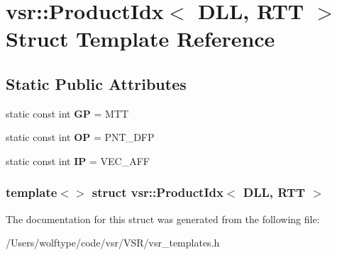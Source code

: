 \hypertarget{structvsr_1_1_product_idx_3_01_d_l_l_00_01_r_t_t_01_4}{\section{vsr\-:\-:Product\-Idx$<$ D\-L\-L, R\-T\-T $>$ Struct Template Reference}
\label{structvsr_1_1_product_idx_3_01_d_l_l_00_01_r_t_t_01_4}
}
\subsection*{Static Public Attributes}
\begin{DoxyCompactItemize}
\item 
\hypertarget{structvsr_1_1_product_idx_3_01_d_l_l_00_01_r_t_t_01_4_ac165e664111b996ece58e6d2708e7d6e}{static const int {\bfseries G\-P} = M\-T\-T}\label{structvsr_1_1_product_idx_3_01_d_l_l_00_01_r_t_t_01_4_ac165e664111b996ece58e6d2708e7d6e}

\item 
\hypertarget{structvsr_1_1_product_idx_3_01_d_l_l_00_01_r_t_t_01_4_a14f3c68b78e935e30bf356f6651045c0}{static const int {\bfseries O\-P} = P\-N\-T\-\_\-\-D\-F\-P}\label{structvsr_1_1_product_idx_3_01_d_l_l_00_01_r_t_t_01_4_a14f3c68b78e935e30bf356f6651045c0}

\item 
\hypertarget{structvsr_1_1_product_idx_3_01_d_l_l_00_01_r_t_t_01_4_aab9e9d7aa0c8ad3567a9e0e09d9bc85c}{static const int {\bfseries I\-P} = V\-E\-C\-\_\-\-A\-F\-F}\label{structvsr_1_1_product_idx_3_01_d_l_l_00_01_r_t_t_01_4_aab9e9d7aa0c8ad3567a9e0e09d9bc85c}

\end{DoxyCompactItemize}
\subsubsection*{template$<$$>$ struct vsr\-::\-Product\-Idx$<$ D\-L\-L, R\-T\-T $>$}



The documentation for this struct was generated from the following file\-:\begin{DoxyCompactItemize}
\item 
/\-Users/wolftype/code/vsr/\-V\-S\-R/vsr\-\_\-templates.\-h\end{DoxyCompactItemize}
